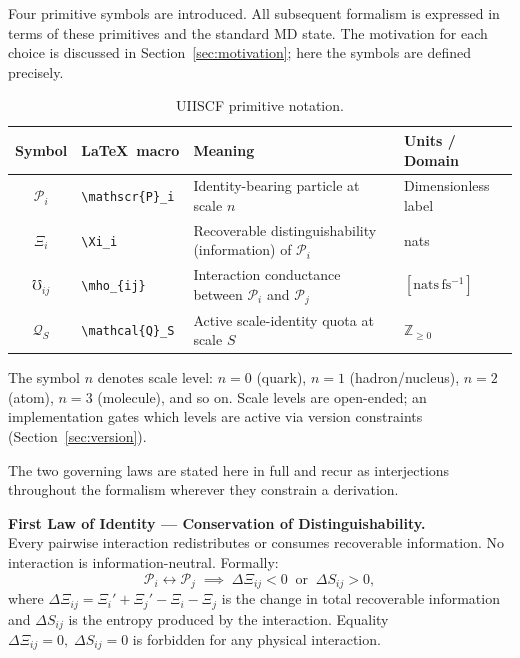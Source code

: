 \documentclass[11pt,a4paper]{article}
\newcommand{\Pid}{\mathscr{P}}
\newcommand{\Rec}{\Xi}
\newcommand{\Cond}{\mho}
\newcommand{\Quota}{\mathcal{Q}}
\begin{document}
Four primitive symbols are introduced.  All subsequent formalism is expressed
in terms of these primitives and the standard MD state.  The motivation for
each choice is discussed in Section~\ref{sec:motivation}; here the symbols
are defined precisely.

\begin{table}[H]
\centering
\caption{UIISCF primitive notation.}
\label{tab:notation}
\begin{tabular}{@{}clll@{}}
\toprule
Symbol & \LaTeX\ macro & Meaning & Units / Domain \\
\midrule
$\Pid_i$ & \texttt{\textbackslash mathscr\{P\}\_i} &
  Identity-bearing particle at scale $n$ &
  Dimensionless label \\
$\Rec_i$ & \texttt{\textbackslash Xi\_i} &
  Recoverable distinguishability (information) of $\Pid_i$ &
  nats \\
$\Cond_{ij}$ & \texttt{\textbackslash mho\_\{ij\}} &
  Interaction conductance between $\Pid_i$ and $\Pid_j$ &
  $[\mathrm{nats\,fs^{-1}}]$ \\
$\Quota_S$ & \texttt{\textbackslash mathcal\{Q\}\_S} &
  Active scale-identity quota at scale $S$ &
  $\mathbb{Z}_{\geq 0}$ \\
\bottomrule
\end{tabular}
\end{table}

\noindent
The symbol $n$ denotes scale level: $n=0$ (quark), $n=1$ (hadron/nucleus),
$n=2$ (atom), $n=3$ (molecule), and so on.  Scale levels are open-ended;
an implementation gates which levels are active via version constraints
(Section~\ref{sec:version}).

\bigskip

The two governing laws are stated here in full and recur as interjections
throughout the formalism wherever they constrain a derivation.

\begin{smlaw}
\textbf{First Law of Identity --- Conservation of Distinguishability.}\\[4pt]
Every pairwise interaction redistributes or consumes recoverable information.
No interaction is information-neutral.  Formally:
\[
  \Pid_i \leftrightarrow \Pid_j
  \;\implies\;
  \Delta\Rec_{ij} < 0 \;\;\text{or}\;\; \Delta S_{ij} > 0 ,
\]
where $\Delta\Rec_{ij} = \Rec_i' + \Rec_j' - \Rec_i - \Rec_j$ is the change
in total recoverable information and $\Delta S_{ij}$ is the entropy produced
by the interaction.  Equality $\Delta\Rec_{ij}=0,\;\Delta S_{ij}=0$ is
forbidden for any physical interaction.
\end{smlaw}
\end{document}
